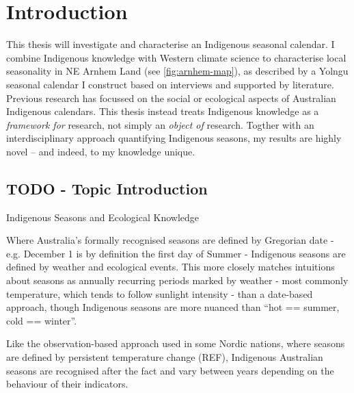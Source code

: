 \chapter{Introduction}



This thesis will investigate and characterise an Indigenous seasonal calendar.
I combine Indigenous knowledge with Western climate science to characterise
local seasonality in NE Arnhem Land (see \autoref{fig:arnhem-map}),
as described by a Yolngu seasonal calendar I construct based on
interviews and supported by literature.\\

Previous research has focussed on the social or ecological aspects of Australian
Indigenous calendars.  This thesis instead treats Indigenous knowledge as a
\emph{framework for} research, not simply an \emph{object of} research.
Togther with an interdisciplinary approach quantifying Indigenous seasons,
my results are highly novel -- and indeed, to my knowledge unique.



\section{TODO - Topic Introduction}
Indigenous Seasons and Ecological Knowledge




Where Australia's formally recognised seasons are defined by Gregorian date -
e.g. December 1 is by definition the first day of Summer - Indigenous seasons
are defined by weather and ecological events.
%
This more closely matches intuitions about seasons as annually recurring
periods marked by weather - most commonly temperature, which tends to
follow sunlight intensity - than a date-based approach, though Indigenous
seasons are more nuanced than ``hot == summer, cold == winter''.

Like the observation-based approach used in some Nordic nations, where
seasons are defined by persistent temperature change (REF),
Indigenous Australian seasons are recognised after the fact and vary
between years depending on the behaviour of their indicators.



